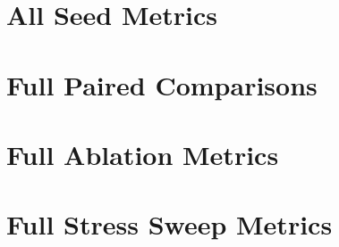\documentclass{article}
\begin{document}
\section{All Seed Metrics}


\section{Full Paired Comparisons}


\section{Full Ablation Metrics}


\section{Full Stress Sweep Metrics}




\end{document}
